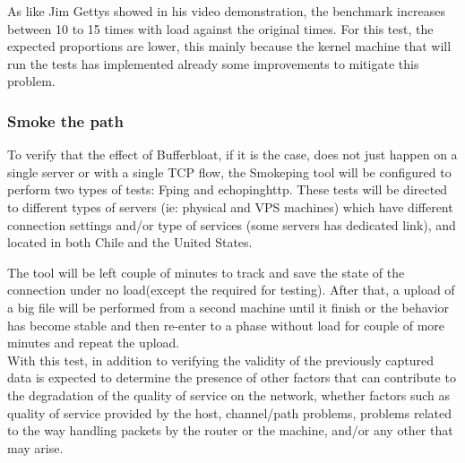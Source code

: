 As like Jim Gettys showed in his video demonstration\cite{gettysex}, the 
benchmark increases between 10 to 15 times with load against the original times. 
For this test, the expected proportions are lower, this mainly because the 
kernel machine that will run the tests has implemented already some improvements 
to mitigate this problem.\\

\subsubsection{Smoke the path}
To verify that the effect of Bufferbloat, if it is the case, does not just
happen on a single server or with a single TCP flow, the Smokeping tool will be
configured to perform two types of tests: Fping and echopinghttp. These tests
will be directed to different types of servers (ie: physical and VPS machines)
which have different connection settings and/or type of services (some servers
has dedicated link), and located in both Chile and the United States.

The tool will be left couple of minutes to track and save the state of the
connection under no load(except the required for testing). After that, a upload
of a big file will be performed from a second machine until it finish or the
behavior has become stable and then re-enter to a phase without load for couple
of more minutes and repeat the upload.\\

With this test, in addition to verifying the validity of the previously captured
data is expected to determine the presence of other factors that can contribute
to the degradation of the quality of service on the network, whether factors
such as quality of service provided by the host, channel/path problems, problems
related to the way handling packets by the router or the machine, and/or any
other that may arise.\\
